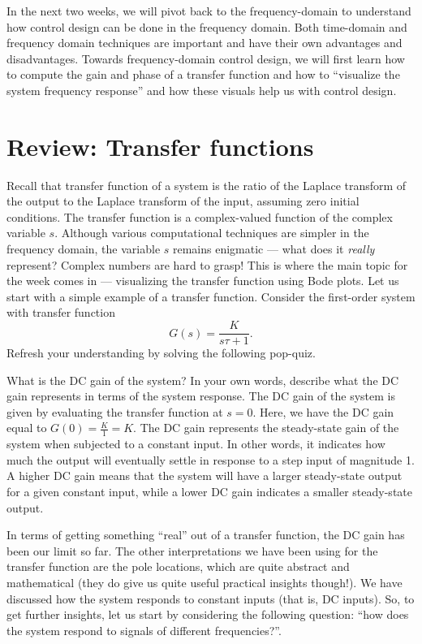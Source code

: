 \documentclass{ee122_notes}
\begin{document}
In the next two weeks, we will pivot back to the frequency-domain to understand how control design can be done in the frequency domain. Both time-domain and frequency domain techniques are important and have their own advantages and disadvantages. Towards frequency-domain control design, we will first learn how to compute the gain and phase of a transfer function and how to ``visualize the system frequency response'' and how these visuals help us with control design.
\section{Review: Transfer functions}
Recall that transfer function of a system is the ratio of the Laplace transform of the output to the Laplace transform of the input, assuming zero initial conditions. The transfer function is a complex-valued function of the complex variable \(s\). Although various computational techniques are simpler in the frequency domain, the variable $s$ remains enigmatic --- what does it \textit{really} represent? Complex numbers are hard to grasp! This is where the main topic for the week comes in --- visualizing the transfer function using Bode plots. Let us start with a simple example of a transfer function. Consider the first-order system with transfer function
\[
G(s) = \frac{K}{s\tau + 1}.
\]
Refresh your understanding by solving the following pop-quiz.
\begin{popquiz}
What is the DC gain of the system? In your own words, describe what the DC gain represents in terms of the system response.
\popqsplit 
The DC gain of the system is given by evaluating the transfer function at \(s=0\). Here, we have the DC gain equal to \(G(0) = \frac{K}{1} = K\). The DC gain represents the steady-state gain of the system when subjected to a constant input. In other words, it indicates how much the output will eventually settle in response to a step input of magnitude 1. A higher DC gain means that the system will have a larger steady-state output for a given constant input, while a lower DC gain indicates a smaller steady-state output.
\end{popquiz}
In terms of getting something ``real'' out of a transfer function, the DC gain has been our limit so far. The other interpretations we have been using for the transfer function are the pole locations, which are quite abstract and mathematical (they do give us quite useful practical insights though!). We have discussed how the system responds to constant inputs (that is, DC inputs). So, to get further insights, let us start by considering the following question: ``how does the system respond to signals of different frequencies?''. 
\end{document}

